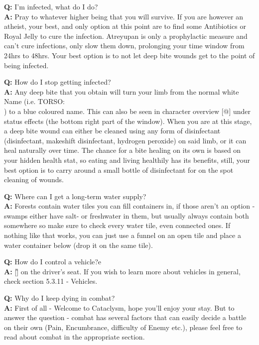 \documentclass[11pt]{report}
\begin{document}
\textbf{Q:} I'm infected, what do I do?\\
\textbf{A:} Pray to whatever higher being that you will survive. If you are however an atheist, your best, and only option at this point are to find some Antibiotics or Royal Jelly to cure the infection. Atreyupan is only a prophylactic measure and can't cure infections, only slow them down, prolonging your time window from 24hrs to 48hrs. Your best option is to not let deep bite wounds get to the point of being infected.

\textbf{Q:} How do I stop getting infected?\\
\textbf{A:} Any deep bite that you obtain will turn your limb from the normal white Name (i.e. TORSO: \textbar\textbar\textbar\textbar\\) to a blue coloured name. This can also be seen in character overview [@] under status effects (the bottom right part of the window). When you are at this stage, a deep bite wound can either be cleaned using any form of disinfectant (disinfectant, makeshift disinfectant, hydrogen peroxide) on said limb, or it can heal naturally over time. The chance for a bite healing on its own is based on your hidden health stat, so eating and living healthily has its benefits, still, your best option is to carry around a small bottle of disinfectant for on the spot cleaning of wounds.

\textbf{Q:} Where can I get a long-term water supply?\\
\textbf{A:} Forests contain water tiles you can fill containers in, if those aren't an option - swamps either have salt- or freshwater in them, but usually always contain both somewhere so make sure to check every water tile, even connected ones. If nothing like that works, you can just use a funnel on an open tile and place a water container below (drop it on the same tile).

\textbf{Q:} How do I control a vehicle?e\\
\textbf{A:} [\^] on the driver's seat. If you wish to learn more about vehicles in general, check section 5.3.11 - Vehicles.

\textbf{Q:} Why do I keep dying in combat?\\
\textbf{A:} First of all - Welcome to Cataclysm, hope you'll enjoy your stay. But to answer the question - combat has several factors that can easily decide a battle on their own (Pain, Encumbrance, difficulty of Enemy etc.), please feel free to read about combat in the appropriate section.
\end{document}
